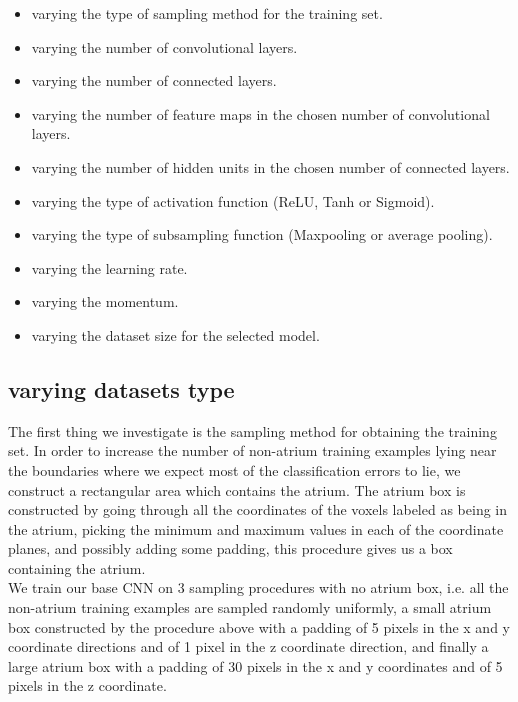 \begin{itemize}
	\item varying the type of sampling method for the training set.
	\item varying the number of convolutional layers.
	\item varying the number of connected layers.
	\item varying the number of feature maps in the chosen number of convolutional layers.
	\item varying the number of hidden units in the chosen number of connected layers.
	\item varying the type of activation function (ReLU, Tanh or Sigmoid).
	\item varying the type of subsampling function (Maxpooling or average pooling).
	\item varying the learning rate.
	\item varying the momentum.
	\item varying the dataset size for the selected model.
\end{itemize}

\subsection{varying datasets type}

The first thing we investigate is the sampling method for obtaining the training set. In order to increase the number of non-atrium training examples lying near the boundaries where we expect most of the classification errors to lie, we construct a rectangular area which contains the atrium. The atrium box is constructed by going through all the coordinates of the voxels labeled as being in the atrium, picking the minimum and maximum values in each of the coordinate planes, and possibly adding some padding, this procedure gives us a box containing the atrium. \\

We train our base CNN on 3 sampling procedures with no atrium box, i.e. all the non-atrium training examples are sampled randomly uniformly, a small atrium box constructed by the procedure above with a padding of 5 pixels in the x and y coordinate directions and of 1 pixel in the z coordinate direction, and finally a large atrium box with a padding of 30 pixels in the x and y coordinates and of 5 pixels in the z coordinate.\\

